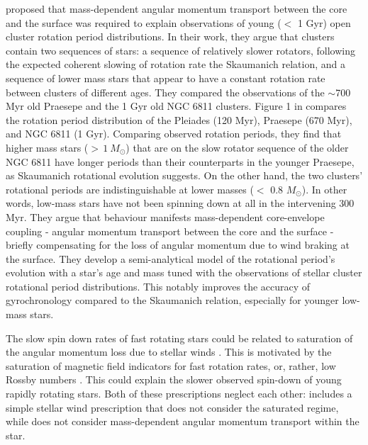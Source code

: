 \citet{spada_competing_2020} proposed that mass-dependent angular momentum transport between the core and the surface was required to explain observations of young ($<$ 1 Gyr) open cluster rotation period distributions.
In their work, they argue that clusters contain two sequences of stars: a sequence of relatively slower rotators, following the expected coherent slowing of rotation rate  the Skaumanich relation, and a sequence of lower mass stars that appear to have a constant rotation rate between clusters of different ages.
They compared the observations of the $\sim$700 Myr old Praesepe and the 1 Gyr old NGC 6811 clusters.
Figure 1 in \citet{spada_competing_2020} compares the rotation period distribution of the Pleiades (120 Myr), Praesepe (670 Myr), and NGC 6811 (1 Gyr).
Comparing observed rotation periods, they find that higher mass stars (${>\,1 \ M_{\odot}}$) that are on the slow rotator sequence of the older NGC 6811 have longer periods than their counterparts in the younger Praesepe, as Skaumanich rotational evolution suggests.
On the other hand, the two clusters' rotational periods are indistinguishable at lower masses ($<$ 0.8 $M_{\odot}$).
In other words, low-mass stars have not been spinning down at all in the intervening 300 Myr. 
They argue that behaviour manifests mass-dependent core-envelope coupling - angular momentum transport between the core and the surface - briefly compensating for the loss of angular momentum due to wind braking at the surface.
They develop a semi-analytical model of the rotational period's evolution with a star's age and mass tuned with the observations of stellar cluster rotational period distributions.
This notably improves the accuracy of gyrochronology compared to the Skaumanich relation, especially for younger low-mass stars.

The slow spin down rates of fast rotating stars could  be related to saturation of the angular momentum loss due to stellar winds \citep{johnstone_stellar_2015, johnstone_stellar_2015-1,gallet_improved_2013}.
This is motivated by the saturation of magnetic field indicators for fast rotation rates, or, rather, low Rossby numbers \citep{wright_stellar-activity-rotation_2011}.
This could explain the slower observed spin-down of young rapidly rotating stars.
Both of these prescriptions neglect each other: \citet{spada_competing_2020} includes a simple stellar wind prescription that does not consider the saturated regime, while \citet{gallet_improved_2013} does not consider mass-dependent angular momentum transport within the star.

